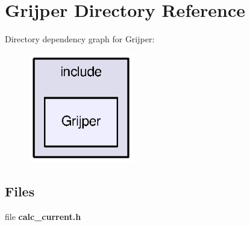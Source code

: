 \section{Grijper Directory Reference}
\label{dir_ae8790247ba36c55494e1e7e9b8bfdab}
Directory dependency graph for Grijper\-:\nopagebreak
\begin{figure}[H]
\begin{center}
\leavevmode
\includegraphics[width=130pt]{dir_ae8790247ba36c55494e1e7e9b8bfdab_dep}
\end{center}
\end{figure}
\subsection*{Files}
\begin{DoxyCompactItemize}
\item 
file {\bf calc\-\_\-current.\-h}
\end{DoxyCompactItemize}
